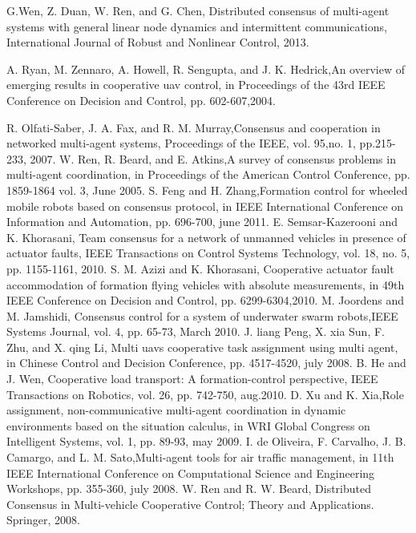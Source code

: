 \begin{thebibliography}{99}
   G.Wen, Z. Duan, W. Ren, and G. Chen, Distributed consensus of multi-agent systems with general linear node dynamics and intermittent communications, International Journal of Robust and Nonlinear Control, 2013.
	
	A. Ryan, M. Zennaro, A. Howell, R. Sengupta, and J. K. Hedrick,An overview of emerging results in cooperative uav control, in Proceedings of the 43rd IEEE Conference on Decision and Control, pp. 602-607,2004.
	
   R. Olfati-Saber, J. A. Fax, and R. M. Murray,Consensus and cooperation in networked multi-agent systems, Proceedings of the IEEE, vol. 95,no. 1, pp.215-233, 2007.
	W. Ren, R. Beard, and E. Atkins,A survey of consensus problems in multi-agent coordination, in Proceedings of the American Control Conference, pp. 1859-1864 vol. 3, June 2005.
	S. Feng and H. Zhang,Formation control for wheeled mobile robots based on consensus protocol, in IEEE International Conference on Information
	and Automation, pp. 696-700, june 2011.
	E. Semsar-Kazerooni and K. Khorasani, Team consensus for a network of unmanned vehicles in presence of actuator faults, IEEE Transactions on Control Systems Technology, vol. 18, no. 5, pp. 1155-1161, 2010.
	S. M. Azizi and K. Khorasani, Cooperative actuator fault accommodation of formation flying vehicles with absolute measurements, in 49th IEEE Conference on Decision and Control, pp. 6299-6304,2010.
	M. Joordens and M. Jamshidi, Consensus control for a system of underwater swarm robots,IEEE Systems Journal, vol. 4, pp. 65-73, March 2010. 
	J. liang Peng, X. xia Sun, F. Zhu, and X. qing Li, Multi uavs cooperative task assignment using multi agent, in Chinese Control and Decision
	Conference, pp. 4517-4520, july 2008.
	B. He and J. Wen, Cooperative load transport: A formation-control perspective, IEEE Transactions on Robotics, vol. 26, pp. 742-750, aug.2010.
	D. Xu and K. Xia,Role assignment, non-communicative multi-agent coordination in dynamic environments based on the situation calculus, in WRI Global Congress on Intelligent Systems, vol. 1, pp. 89-93, may
	2009.
	I. de Oliveira, F. Carvalho, J. B. Camargo, and L. M. Sato,Multi-agent tools for air traffic management, in 11th IEEE International Conference on Computational Science and Engineering Workshops, pp. 355-360, july 2008.
	W. Ren and R. W. Beard, Distributed Consensus in Multi-vehicle Cooperative Control; Theory and Applications. Springer, 2008.

\end{thebibliography}

